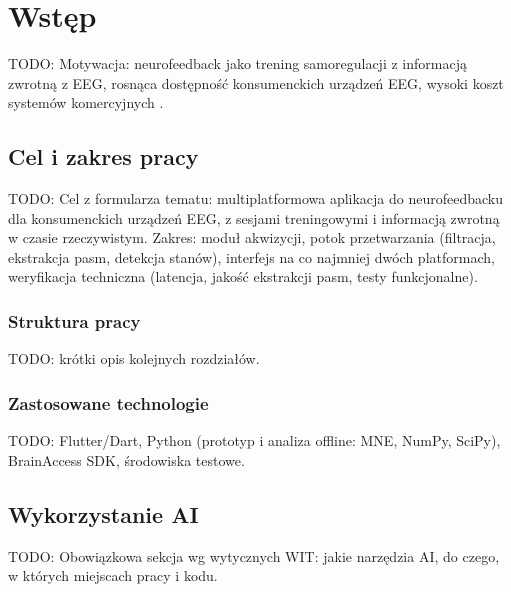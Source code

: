 \chapter{Wstęp}
\label{chapt:Wstep}

TODO: Motywacja: neurofeedback jako trening samoregulacji z informacją zwrotną z EEG, rosnąca dostępność konsumenckich urządzeń EEG, wysoki koszt systemów komercyjnych \cite{KawalaSterniuk2021}.

\section{Cel i zakres pracy}
TODO: Cel z formularza tematu: multiplatformowa aplikacja do neurofeedbacku dla konsumenckich urządzeń EEG, z sesjami treningowymi i informacją zwrotną w czasie rzeczywistym.
Zakres: moduł akwizycji, potok przetwarzania (filtracja, ekstrakcja pasm, detekcja stanów), interfejs na co najmniej dwóch platformach, weryfikacja techniczna (latencja, jakość ekstrakcji pasm, testy funkcjonalne).

\subsection*{Struktura pracy}
TODO: krótki opis kolejnych rozdziałów.

\subsection*{Zastosowane technologie}
TODO: Flutter/Dart, Python (prototyp i analiza offline: MNE, NumPy, SciPy), BrainAccess SDK, środowiska testowe.

\section{Wykorzystanie AI}
TODO: Obowiązkowa sekcja wg wytycznych WIT: jakie narzędzia AI, do czego, w których miejscach pracy i kodu.
